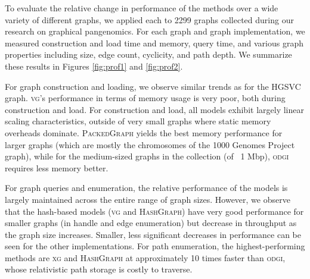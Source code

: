 \documentclass{article}
\begin{document}
To evaluate the relative change in performance of the methods over a wide variety of different graphs, we applied each to 2299 graphs collected during our research on graphical pangenomics.
For each graph and graph implementation, we measured construction and load time and memory, query time, and various graph properties including size, edge count, cyclicity, and path depth.
We summarize these results in Figures \ref{fig:prof1} and \ref{fig:prof2}.

For graph construction and loading, we observe similar trends as for the HGSVC graph.
\textsc{vg}'s performance in terms of memory usage is very poor, both during construction and load.
For construction and load, all models exhibit largely linear scaling characteristics, outside of very small graphs where static memory overheads dominate.
\textsc{PackedGraph} yields the best memory performance for larger graphs (which are mostly the chromosomes of the 1000 Genomes Project graph), while for the medium-sized graphs in the collection (of ~1 Mbp), \textsc{odgi} requires less memory better.

For graph queries and enumeration, the relative performance of the models is largely maintained across the entire range of graph sizes.
However, we observe that the hash-based models (\textsc{vg} and \textsc{HashGraph}) have very good performance for smaller graphs (in handle and edge enumeration) but decrease in throughput as the graph size increases.
Smaller, less significant decreases in performance can be seen for the other implementations.
For path enumeration, the highest-performing methods are \textsc{xg} and \textsc{HashGraph} at approximately 10 times faster than \textsc{odgi}, whose relativistic path storage is costly to traverse.





\end{document}
